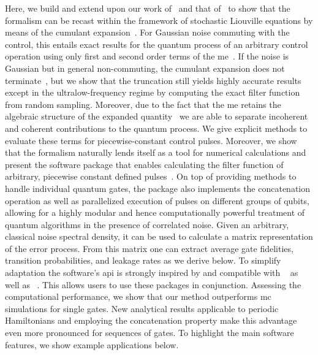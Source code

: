 Here, we build and extend upon our work of~ and that of~ to show that the formalism can be recast within the framework of stochastic Liouville equations by means of the cumulant expansion~\cite{Kubo1962,Kubo1963,Fox1976,Bianucci2020}.
For Gaussian noise commuting with the control, this entails exact results for the quantum process of an arbitrary control operation using only first and second order terms of the \gls{me}~\cite{Magnus1954}.
If the noise is Gaussian but in general non-commuting, the cumulant expansion does not terminate~\cite{Fox1976}, but we show that the truncation still yields highly accurate results except in the ultralow-frequency regime by computing the exact filter function from random sampling.
Moreover, due to the fact that the \gls{me} retains the algebraic structure of the expanded quantity~\cite{Blanes2009} we are able to separate incoherent and coherent contributions to the quantum process.
We give explicit methods to evaluate these terms for piecewise-constant control pulses.
Moreover, we show that the formalism naturally lends itself as a tool for numerical calculations and present the \filterfunctions \python software package that enables calculating the filter function of arbitrary, piecewise constant defined pulses~\cite{Hangleiter_ff}.
On top of providing methods to handle individual quantum gates, the package also implements the concatenation operation as well as parallelized execution of pulses on different groups of qubits, allowing for a highly modular and hence computationally powerful treatment of quantum algorithms in the presence of correlated noise.
Given an arbitrary, classical noise spectral density, it can be used to calculate a matrix representation of the error process.
From this matrix one can extract average gate fidelities, transition probabilities, and leakage rates as we derive below.
To simplify adaptation the software's \gls{api} is strongly inspired by and compatible with \qutip~\cite{Johansson2012} as well as \qopt~\cite{Teske2022}.
This allows users to use these packages in conjunction.
Assessing the computational performance, we show that our method outperforms \gls{mc} simulations for single gates.
New analytical results applicable to periodic Hamiltonians and employing the concatenation property make this advantage even more pronounced for sequences of gates.
To highlight the main software features, we show example applications below.

